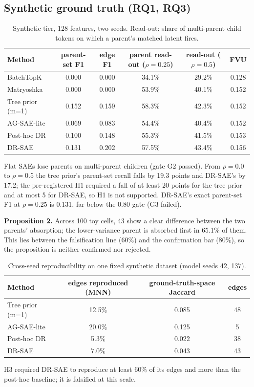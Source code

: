 \documentclass[10pt]{article}
\begin{document}
\subsection{Synthetic ground truth (RQ1, RQ3)}
\begin{table}[h]\centering\small
\begin{tabular}{lccccc}\toprule
Method & parent-set F1 & edge F1 & parent read-out ($\rho=0.25$) & read-out ($\rho=0.5$) & FVU \\\midrule
BatchTopK & 0.000 & 0.000 & 34.1\% & 29.2\% & 0.128 \\
Matryoshka & 0.000 & 0.000 & 53.9\% & 40.1\% & 0.152 \\
Tree prior (m=1) & 0.152 & 0.159 & 58.3\% & 42.3\% & 0.152 \\
AG-SAE-lite & 0.069 & 0.083 & 54.4\% & 40.4\% & 0.152 \\
Post-hoc DR & 0.100 & 0.148 & 55.3\% & 41.5\% & 0.153 \\
DR-SAE & 0.131 & 0.202 & 57.5\% & 43.4\% & 0.156 \\
\bottomrule\end{tabular}
\caption{Synthetic tier, 128 features, two seeds. Read-out: share of multi-parent child tokens on which a parent's matched latent fires.}
\end{table}
Flat SAEs lose parents on multi-parent children (gate G2 passed). From $\rho = 0.0$ to $\rho = 0.5$ the tree prior's parent-set recall falls by 19.3 points and DR-SAE's by 17.2; the pre-registered H1 required a fall of at least 20 points for the tree prior and at most 5 for DR-SAE, so H1 is not supported. DR-SAE's exact parent-set F1 at $\rho = 0.25$ is 0.131, far below the 0.80 gate (G3 failed).

\textbf{Proposition 2.} Across 100 toy cells, 43 show a clear difference between the two parents' absorption; the lower-variance parent is absorbed first in 65.1\% of them. This lies between the falsification line (60\%) and the confirmation bar (80\%), so the proposition is neither confirmed nor rejected.

\begin{table}[h]\centering\small
\begin{tabular}{lccc}\toprule
Method & edges reproduced (MNN) & ground-truth-space Jaccard & edges \\\midrule
Tree prior (m=1) & 12.5\% & 0.085 & 48 \\
AG-SAE-lite & 20.0\% & 0.125 & 5 \\
Post-hoc DR & 5.3\% & 0.022 & 38 \\
DR-SAE & 7.0\% & 0.043 & 43 \\
\bottomrule\end{tabular}
\caption{Cross-seed reproducibility on one fixed synthetic dataset (model seeds 42, 137).}
\end{table}
H3 required DR-SAE to reproduce at least 60\% of its edges and more than the post-hoc baseline; it is falsified at this scale.
\end{document}
